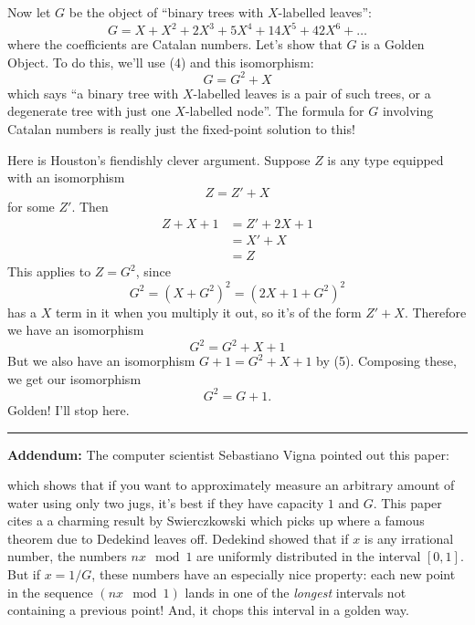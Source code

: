 \documentclass{article}
\def\tightlist{}
\renewcommand{\texttt}[1]{%
  \begingroup
  \ttfamily
  \begingroup\lccode`~=`/\lowercase{\endgroup\def~}{/\discretionary{}{}{}}%
  \begingroup\lccode`~=`[\lowercase{\endgroup\def~}{[\discretionary{}{}{}}%
  \begingroup\lccode`~=`.\lowercase{\endgroup\def~}{.\discretionary{}{}{}}%
  \catcode`/=\active\catcode`[=\active\catcode`.=\active
  \scantokens{#1\noexpand}%
  \endgroup
}
\begin{document}
Now let \(G\) be the object of ``binary trees with \(X\)-labelled
leaves'': \[G = X + X^2 + 2X^3 + 5X^4 + 14X^5 + 42X^6 + \ldots\] where
the coefficients are Catalan numbers. Let's show that \(G\) is a Golden
Object. To do this, we'll use (4) and this isomorphism:
\[G = G^2 + X \tag{5}\] which says ``a binary tree with \(X\)-labelled
leaves is a pair of such trees, or a degenerate tree with just one
\(X\)-labelled node''. The formula for \(G\) involving Catalan numbers
is really just the fixed-point solution to this!

Here is Houston's fiendishly clever argument. Suppose \(Z\) is any type
equipped with an isomorphism \[Z = Z' + X\] for some \(Z'\). Then \[
  \begin{aligned}
    Z + X + 1
    &= Z' + 2X + 1
  \\&= X' + X
  \\&= Z
  \end{aligned}
\] This applies to \(Z = G^2\), since
\[G^2 = (X + G^2)^2 = (2X + 1 + G^2)^2\] has a \(X\) term in it when you
multiply it out, so it's of the form \(Z' + X\). Therefore we have an
isomorphism \[G^2 = G^2 + X + 1\] But we also have an isomorphism
\(G + 1 = G^2 + X + 1\) by (5). Composing these, we get our isomorphism
\[G^2 = G + 1.\] Golden! I'll stop here.

\begin{center}\rule{0.5\linewidth}{0.5pt}\end{center}

\textbf{Addendum:} The computer scientist Sebastiano Vigna pointed out
this paper:


which shows that if you want to approximately measure an arbitrary
amount of water using only two jugs, it's best if they have capacity
\(1\) and \(G\). This paper cites a a charming result by Swierczkowski
which picks up where a famous theorem due to Dedekind leaves off.
Dedekind showed that if \(x\) is any irrational number, the numbers
\(nx \mod 1\) are uniformly distributed in the interval \([0,1]\). But
if \(x = 1/G\), these numbers have an especially nice property: each new
point in the sequence \((nx \mod 1)\) lands in one of the \emph{longest}
intervals not containing a previous point! And, it chops this interval
in a golden way.
\end{document}
